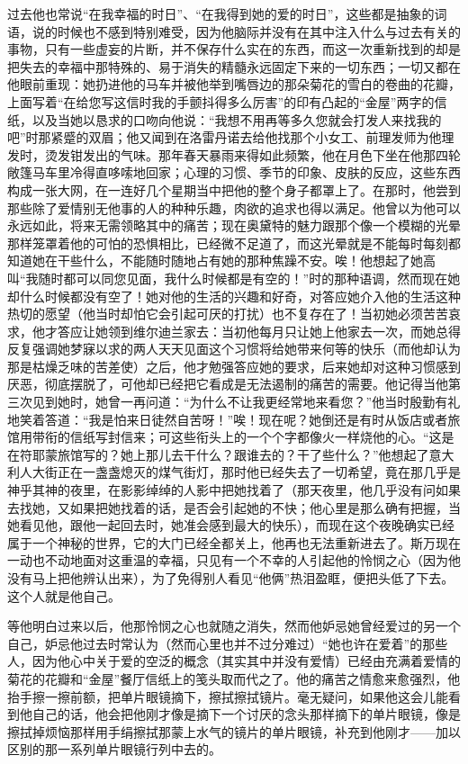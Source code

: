 \par 过去他也常说“在我幸福的时日”、“在我得到她的爱的时日”，这些都是抽象的词语，说的时候也不感到特别难受，因为他脑际并没有在其中注入什么与过去有关的事物，只有一些虚妄的片断，并不保存什么实在的东西，而这一次重新找到的却是把失去的幸福中那特殊的、易于消失的精髓永远固定下来的一切东西；一切又都在他眼前重现：她扔进他的马车并被他举到嘴唇边的那朵菊花的雪白的卷曲的花瓣，上面写着“在给您写这信时我的手颤抖得多么厉害”的印有凸起的“金屋”两字的信纸，以及当她以恳求的口吻向他说：“我想不用再等多久您就会打发人来找我的吧”时那紧蹙的双眉；他又闻到在洛雷丹诺去给他找那个小女工、前理发师为他理发时，烫发钳发出的气味。那年春天暴雨来得如此频繁，他在月色下坐在他那四轮敞篷马车里冷得直哆嗦地回家；心理的习惯、季节的印象、皮肤的反应，这些东西构成一张大网，在一连好几个星期当中把他的整个身子都罩上了。在那时，他尝到那些除了爱情别无他事的人的种种乐趣，肉欲的追求也得以满足。他曾以为他可以永远如此，将来无需领略其中的痛苦；现在奥黛特的魅力跟那个像一个模糊的光晕那样笼罩着他的可怕的恐惧相比，已经微不足道了，而这光晕就是不能每时每刻都知道她在干些什么，不能随时随地占有她的那种焦躁不安。唉！他想起了她高叫“我随时都可以同您见面，我什么时候都是有空的！”时的那种语调，然而现在她却什么时候都没有空了！她对他的生活的兴趣和好奇，对答应她介入他的生活这种热切的愿望（他当时却怕它会引起可厌的打扰）也不复存在了！当初她必须苦苦哀求，他才答应让她领到维尔迪兰家去：当初他每月只让她上他家去一次，而她总得反复强调她梦寐以求的两人天天见面这个习惯将给她带来何等的快乐（而他却认为那是枯燥乏味的苦差使）之后，他才勉强答应她的要求，后来她却对这种习惯感到厌恶，彻底摆脱了，可他却已经把它看成是无法遏制的痛苦的需要。他记得当他第三次见到她时，她曾一再问道：“为什么不让我更经常地来看您？”他当时殷勤有礼地笑着答道：“我是怕来日徒然自苦呀！”唉！现在呢？她倒还是有时从饭店或者旅馆用带衔的信纸写封信来；可这些衔头上的一个个字都像火一样烧他的心。“这是在符耶蒙旅馆写的？她上那儿去干什么？跟谁去的？干了些什么？”他想起了意大利人大街正在一盏盏熄灭的煤气街灯，那时他已经失去了一切希望，竟在那几乎是神乎其神的夜里，在影影绰绰的人影中把她找着了（那天夜里，他几乎没有问如果去找她，又如果把她找着的话，是否会引起她的不快；他心里是那么确有把握，当她看见他，跟他一起回去时，她准会感到最大的快乐），而现在这个夜晚确实已经属于一个神秘的世界，它的大门已经全都关上，他再也无法重新进去了。斯万现在一动也不动地面对这重温的幸福，只见有一个不幸的人引起他的怜悯之心（因为他没有马上把他辨认出来），为了免得别人看见“他俩”热泪盈眶，便把头低了下去。这个人就是他自己。
\par 等他明白过来以后，他那怜悯之心也就随之消失，然而他妒忌她曾经爱过的另一个自己，妒忌他过去时常认为（然而心里也并不过分难过）“她也许在爱着”的那些人，因为他心中关于爱的空泛的概念（其实其中并没有爱情）已经由充满着爱情的菊花的花瓣和“金屋”餐厅信纸上的笺头取而代之了。他的痛苦之情愈来愈强烈，他抬手擦一擦前额，把单片眼镜摘下，擦拭擦拭镜片。毫无疑问，如果他这会儿能看到他自己的话，他会把他刚才像是摘下一个讨厌的念头那样摘下的单片眼镜，像是擦拭掉烦恼那样用手绢擦拭那蒙上水气的镜片的单片眼镜，补充到他刚才——加以区别的那一系列单片眼镜行列中去的。

